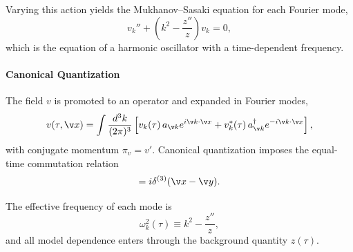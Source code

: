 Varying this action yields the Mukhanov--Sasaki equation for each Fourier mode,
\begin{equation}
v_k'' + \left( k^2 - \frac{z''}{z} \right) v_k = 0 ,
\end{equation}
which is the equation of a harmonic oscillator with a time-dependent frequency.

\paragraph{Canonical Quantization}

The field $v$ is promoted to an operator and expanded in Fourier modes,
\begin{equation}
v(\tau,\v x) =
\int \frac{d^3k}{(2\pi)^3}
\left[ v_k(\tau)\, a_{\v k} e^{i\v k\cdot\v x}
+ v_k^*(\tau)\, a^\dagger_{\v k} e^{-i\v k\cdot\v x} \right],
\end{equation}
with conjugate momentum $\pi_v = v'$. Canonical quantization imposes the equal-time commutation relation
\begin{equation}
[v(\tau,\v x), \pi_v(\tau,\v y)] = i \delta^{(3)}(\v x - \v y).
\end{equation}

The effective frequency of each mode is
\begin{equation}
\omega_k^2(\tau) \equiv k^2 - \frac{z''}{z},
\end{equation}
and all model dependence enters through the background quantity $z(\tau)$.


